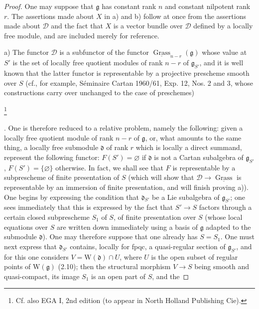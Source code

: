 \begin{proof}
One may suppose that $\mathfrak g$ has constant rank $n$
and constant nilpotent rank $r$. The assertions made about
$X$ in a) and b) follow at once from the assertions made
about $\mathscr D$ and the fact that $X$ is a vector bundle
over $\mathscr D$ defined by a locally free module, and
are included merely for reference.

\noindent a) The functor $\mathscr D$ is a subfunctor of
the functor $\underline{\operatorname{Grass}}_{n-r}(\mathfrak g)$
whose value at $S'$ is the set of locally free quotient
modules of rank $n-r$ of $\mathfrak g_{S'}$, and it is
well known that the latter functor is representable by
a projective prescheme smooth over $S$ (cf., for example,
S\'eminaire Cartan 1960/61, Exp. 12, Nos. 2 and 3, whose
constructions carry over unchanged to the case of
preschemes)%
{\renewcommand{\thefootnote}{*}\footnote{Cf. also EGA I,
2nd edition (to appear in North Holland Publishing Cie).}\addtocounter{footnote}{-1}}%
.
One is therefore reduced to a relative problem, namely
the following: given a locally free quotient module
of rank $n-r$ of $\mathfrak g$, or, what amounts to
the same thing, a locally free submodule $\mathfrak d$
of rank $r$ which is locally a direct summand, represent
the following functor: $F(S')=\varnothing$ if
$\mathfrak d$ is not a Cartan subalgebra of
$\mathfrak g_{S'}$, $F(S')=\{\varnothing\}$ otherwise.
In fact, we shall see that $F$ is representable by
a subprescheme of finite presentation of $S$ (which
will show that $\mathscr D\to\underline{\operatorname{Grass}}$
is representable by an immersion of finite presentation,
and will finish proving a)). One begins by expressing
the condition that $\mathfrak d_{S'}$ be a Lie
subalgebra of $\mathfrak g_{S'}$; one sees immediately
that this is expressed by the fact that $S'\to S$
factors through a certain closed subprescheme $S_1$
of $S$, of finite presentation over $S$ (whose local
equations over $S$ are written down immediately using
a basis of $\mathfrak g$ adapted to the submodule
$\mathfrak d$). One may therefore suppose that one
already has $S=S_1$. One must next express that
$\mathfrak d_{S'}$ contains, locally for fpqc, a
quasi-regular section of $\mathfrak g_{S'}$, and for
this one considers $V=\mathrm W(\mathfrak d)\cap U$,
where $U$ is the open subset of regular points of
$\mathrm W(\mathfrak g)$ (2.10); then the structural
morphism $V\to S$ being smooth and quasi-compact,
its image $S_1$ is an open part of $S$, and the

\end{proof}
